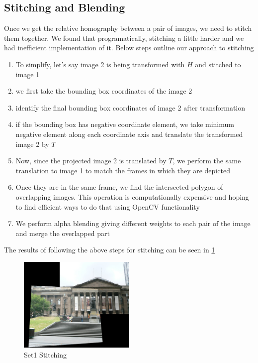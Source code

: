 \documentclass[conference]{IEEEtran}
\begin{document}
\subsection{Stitching and Blending}
Once we get the relative homography between a pair of images, we need to stitch them together. We found that programatically, stitching a little harder and we had inefficient implementation of it. Below steps outline our approach to stitching
\begin{enumerate}
    \item To simplify, let's say image 2 is being transformed with $H$ and stitched to image 1
    \item we first take the bounding box coordinates of the image 2
    \item identify the final bounding box coordinates of image 2 after transformation
    \item if the bounding box has negative coordinate element, we take minimum negative element along each coordinate axis and translate the transformed image 2 by $T$
    \item Now, since the projected image 2 is translated by $T$, we perform the same translation to image 1 to match the frames in which they are depicted
    \item Once they are in the same frame, we find the intersected polygon of overlapping images. This operation is computationally expensive and hoping to find efficient ways to do that using OpenCV functionality
    \item We perform alpha blending giving different weights to each pair of the image and merge the overlapped part
\end{enumerate}

The results of following the above steps for stitching can be seen in \ref{fig:stitch_pair}

\begin{figure}[h]
  \centering
  \captionsetup{justification=centering}
  \includegraphics[width=0.5\textwidth]{phase1/set1_clear_stitch_12.png}
  \caption{\label{fig:stitch_pair}Set1 Stitching}
\end{figure}
\end{document}
